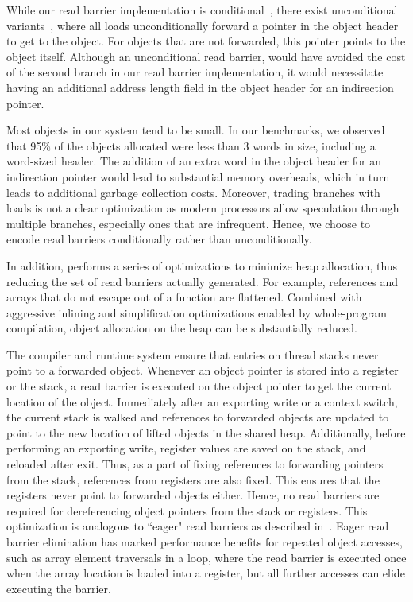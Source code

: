 While our read barrier implementation is conditional~\cite{Baker}, there exist
unconditional variants~\cite{Brooks84}, where all loads unconditionally forward
a pointer in the object header to get to the object. For objects that are not
forwarded, this pointer points to the object itself. Although an unconditional
read barrier, would have avoided the cost of the second branch in our read
barrier implementation, it would necessitate having an additional address
length field in the object header for an indirection pointer.

Most objects in our system tend to be small. In our benchmarks, we observed
that 95\% of the objects allocated were less than 3 words in size, including a
word-sized header. The addition of an extra word in the object header for an
indirection pointer would lead to substantial memory overheads, which in turn
leads to additional garbage collection costs. Moreover, trading branches with
loads is not a clear optimization as modern processors allow speculation
through multiple branches, especially ones that are infrequent. Hence, we
choose to encode read barriers conditionally rather than unconditionally.

In addition, \MM performs a series of optimizations to minimize heap
allocation, thus reducing the set of read barriers actually generated.  For
example, references and arrays that do not escape out of a function are
flattened.  Combined with aggressive inlining and simplification optimizations
enabled by whole-program compilation, object allocation on the heap can be
substantially reduced.

The compiler and runtime system ensure that entries on thread stacks never
point to a forwarded object. Whenever an object pointer is stored into a
register or the stack, a read barrier is executed on the object pointer to get
the current location of the object. Immediately after an exporting write or a
context switch, the current stack is walked and references to forwarded objects
are updated to point to the new location of lifted objects in the shared heap.
Additionally, before performing an exporting write, register values are saved
on the stack, and reloaded after exit. Thus, as a part of fixing references to
forwarding pointers from the stack, references from registers are also fixed.
This ensures that the registers never point to forwarded objects either. Hence,
no read barriers are required for dereferencing object pointers from the stack
or registers. This optimization is analogous to ``eager" read barriers as
described in~\cite{Bacon03}. Eager read barrier elimination has marked
performance benefits for repeated object accesses, such as array element
traversals in a loop, where the read barrier is executed once when the array
location is loaded into a register, but all further accesses can elide
executing the barrier.


